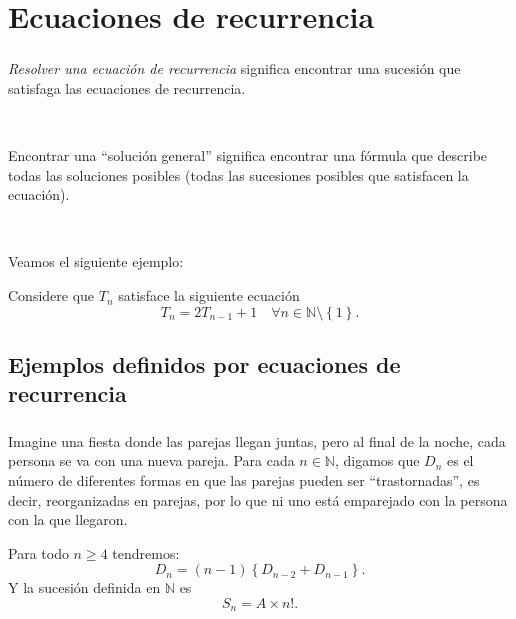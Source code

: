 \section{Ecuaciones de recurrencia}

\begin{frame}
\frametitle{\secname}

\textit{Resolver una ecuación de recurrencia} significa encontrar una sucesión que satisfaga las ecuaciones de recurrencia.

\

Encontrar una ``solución general'' significa encontrar una fórmula que describe todas las soluciones posibles (todas las sucesiones posibles que satisfacen la ecuación).

\

Veamos el siguiente ejemplo:

\begin{claim}
	Considere que $T_{n}$ satisface la siguiente ecuación
	\begin{equation}
	T_{n}=2T_{n-1}+1\quad\forall n\in\mathds{N}\setminus\left\{1\right\}.
	\end{equation}
\end{claim}

\end{frame}

\subsection{Ejemplos definidos por ecuaciones de recurrencia}

\begin{frame}
\frametitle{\subsecname}

\begin{example}[Desajustes]
	Imagine una fiesta donde las parejas llegan juntas, pero al final de la noche, cada persona se va con una nueva pareja. Para cada $n\in\mathds{N}$, digamos que $D_{n}$ es el número de diferentes formas en que las parejas pueden ser ``trastornadas'', es decir, reorganizadas en parejas, por lo que ni uno está emparejado con la persona con la que llegaron.
\end{example}

\begin{claim}
	Para todo $n\geq4$ tendremos: \[ D_{n}=(n-1)\left\{D_{n-2}+D_{n-1}\right\}. \] Y la sucesión definida en $\mathds{N}$ es \[ S_{n} = A \times n!. \]
\end{claim}

\end{frame}

